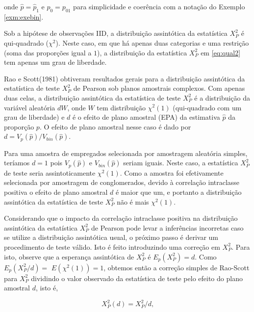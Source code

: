 \documentclass[]{book}
\theoremstyle{definition}
\theoremstyle{definition}
\theoremstyle{definition}
\theoremstyle{remark}
\begin{document}
onde \(\widehat{p}=\widehat{p}_{1}\) e \(p_{0}=p_{01}\) para
simplicidade e coerência com a notação do Exemplo \ref{exm:exebin}.

Sob a hipótese de observações IID, a distribuição assintótica da
estatística \(X_{P}^{2}\) é qui-quadrado (\(\chi^{2}\)). Neste caso, em
que há apenas duas categorias e uma restrição (soma das proporções igual
a \(1\)), a distribuição da estatística \(X_{P}^{2}\) em \eqref{eq:qual2}
tem apenas um grau de liberdade.

Rao e Scott(1981) obtiveram resultados gerais para a distribuição
assintótica da estatística de teste \(X_{P}^{2}\) de Pearson sob planos
amostrais complexos. Com apenas duas celas, a distribuição assintótica
da estatística de teste \(X_{P}^{2}\) é a distribuição da variável
aleatória \(dW\), onde \(W\) tem distribuição
\(\chi ^{2}\left( 1\right)\) (qui-quadrado com um grau de liberdade) e
\(d\) é o efeito de plano amostral (EPA) da estimativa \(\widehat{p}\)
da proporção \(p\). O efeito de plano amostral nesse caso é dado por
\(d=V_{p}\left( \widehat{p}\right) /V_{bin}\left( \widehat{p}\right)\).

Para uma amostra de empregados selecionada por amostragem aleatória
simples, teríamos \(d=1\) pois \(V_{p}\left( \widehat{p}\right)\) e
\(V_{bin}\left( \widehat{p}\right)\) seriam iguais. Neste caso, a
estatística \(X_{P}^{2}\) de teste seria assintoticamente
\(\chi ^{2}\left(1\right)\). Como a amostra foi efetivamente selecionada
por amostragem de conglomerados, devido à correlação intraclasse
positiva o efeito de plano amostral \(d\) é maior que um, e portanto a
distribuição assintótica da estatística de teste \(X_{P}^{2}\) não é
mais \(\chi ^{2}\left( 1\right)\).

Considerando que o impacto da correlação intraclasse positiva na
distribuição assintótica da estatística \(X_{P}^{2}\) de Pearson pode
levar a inferências incorretas caso se utilize a distribuição
assintótica usual, o próximo passo é derivar um procedimento de teste
válido. Isto é feito introduzindo uma correção em \(X_{P}^{2}.\) Para
isto, observe que a esperança assintótica de \(X_{P}^{2}\) é
\(E_{p}\left( X_{P}^{2}\right) =d\). Como
\(E_{p}\left( X_{P}^{2}/d\right) =\)
\(E\left( \chi ^{2}\left( 1\right) \right)=1\), obtemos então a correção
simples de Rao-Scott para \(X_{P}^{2}\) dividindo o valor observado da
estatística de teste pelo efeito do plano amostral \(d\), isto é,

\begin{equation}
X_{P}^{2}(d)=X_{P}^{2}/d\mbox{,}  
\label{eq:qual3}
\end{equation}
\end{document}
